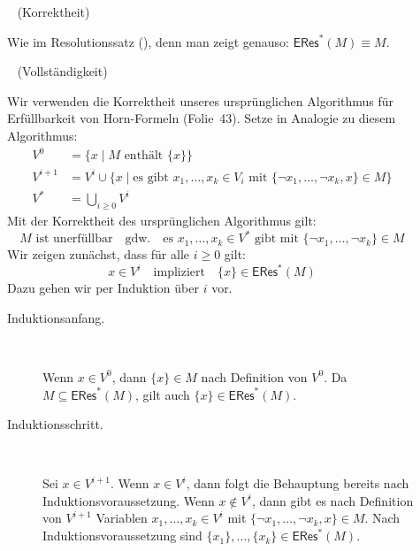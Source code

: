 \documentclass[fontsize=11pt, twoside=false, numbers=autoenddot]{scrbook}
\begin{document}
\par\noindent
\begin{beweis}
  \begin{description}
    \item[]~
      (Korrektheit)
      \par
      Wie im Resolutionssatz (\hyperlink{TBewResSatzKorr}{\TBewResSatzKorr}),
      denn man zeigt genauso: $\textsf{ERes}^*(M) \equiv M$.
    \item[]~
      (Vollständigkeit)
      \par
      Wir verwenden die Korrektheit unseres ursprünglichen Algorithmus
      für Erfüllbarkeit von Horn-Formeln (Folie~43).
      Setze in Analogie zu diesem Algorithmus:
      \begin{align*}
        V^0     & = \big\{x \mid M \text{~enthält~} \{x\}\big\} \\
        V^{i+1} & = V^i \cup \big\{x \mid \text{es gibt~} x_1,\dots,x_k \in V_i \text{~mit~} \{\lnot x_1,\dots,\lnot x_k,x\} \in M\big\} \\[2mm]
        V^*     & = \displaystyle\bigcup_{i \geq 0} V^i
      \end{align*}
      Mit der Korrektheit des ursprünglichen Algorithmus gilt:
      \[
        \tag{$*$}
        M \text{~ist unerfüllbar}
        \quad\text{gdw.}\quad
        \text{es $x_1,\dots,x_k \in V^*$ gibt mit~} \{\lnot x_1,\dots,\lnot x_k\} \in M
      \]
      Wir zeigen zunächst, dass für alle $i \geq 0$ gilt:
      \[
        \tag{$**$}
        x \in V^i
        \quad\text{impliziert}\quad
        \{x\} \in \textsf{ERes}^*(M)
      \]
      Dazu gehen wir per Induktion über $i$ vor.
      \begin{description}
        \item[Induktionsanfang.]
          ~\par
          Wenn $x \in V^0$, dann $\{x\} \in M$ nach Definition von $V^0$.
          Da $M \subseteq \textsf{ERes}^*(M)$,
          gilt auch $\{x\} \in \textsf{ERes}^*(M)$.
        \item[Induktionsschritt.]
          ~\par
          Sei $x \in V^{i+1}$.
          Wenn $x \in V^i$, dann folgt die Behauptung bereits nach Induktionsvoraussetzung.
          Wenn $x \notin V^i$, dann gibt es nach Definition von $V^{i+1}$
          Variablen $x_1,\dots,x_k \in V^i$ mit $\{\lnot x_1,\dots,\lnot x_k,x\} \in M$.
          Nach Induktionsvoraussetzung sind $\{x_1\},\dots,\{x_k\} \in \textsf{ERes}^*(M)$.

\end{description}
\end{description}
\end{beweis}
\end{document}

